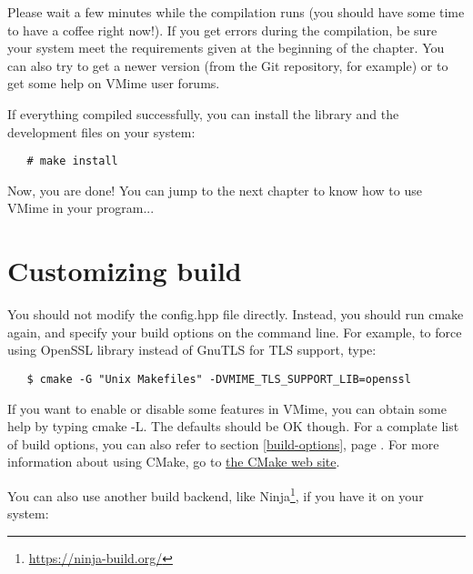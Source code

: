 Please wait a few minutes while the compilation runs (you should have some
time to have a coffee right now!). If you get errors during the compilation,
be sure your system meet the requirements given at the beginning of the
chapter. You can also try to get a newer version (from the Git repository, for
example) or to get some help on VMime user forums.

If everything compiled successfully, you can install the library and
the development files on your system:

\begin{verbatim}
   # make install
\end{verbatim}


Now, you are done! You can jump to the next chapter to know how to use VMime
in your program...


\section{\label{custom-build}Customizing build}

You should not modify the {\vcode config.hpp} file directly. Instead, you
should run {\vcode cmake} again, and specify your build options on the command
line. For example, to force using OpenSSL library instead of GnuTLS for TLS
support, type:

\begin{verbatim}
   $ cmake -G "Unix Makefiles" -DVMIME_TLS_SUPPORT_LIB=openssl
\end{verbatim}

If you want to enable or disable some features in VMime, you can obtain some
help by typing {\vcode cmake -L}. The defaults should be OK though. For a
complate list of build options, you can also refer to section
\ref{build-options}, page \pageref{build-options}. For more information about
using CMake, go to \href{http://www.cmake.org/}{the CMake web site}.


You can also use another build backend, like
Ninja\footnote{\url{https://ninja-build.org/}}, if you have it on your system:

